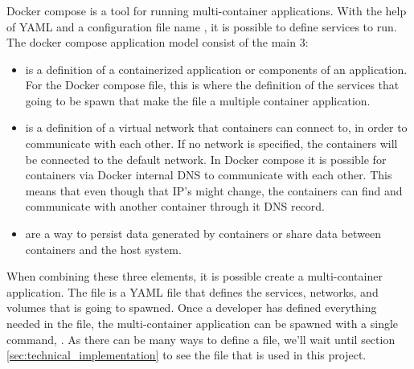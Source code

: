 \subsubsection{}
Docker compose is a tool for running multi-container applications. With the help of \ac{YAML}\cite{YAML}
and a configuration file name , it is possible to define services to run.
The docker compose\cite{docker-compose} application model consist of the main 3:
\begin{itemize}
    \item {} is a definition of a containerized application or components of an application. For the Docker compose file,
    this is where the definition of the services that going to be spawn that make the  file a multiple container application.
    \item {} is a definition of a virtual network that containers can connect to, in order to communicate with each other.
    If no network is specified, the containers will be connected to the default network. In Docker compose it is possible for 
    containers via Docker internal \ac{DNS} to communicate with each other. 
    This means that even though that IP's might change, the containers can find and communicate with another container through it \ac{DNS} record.
    \item {} are a way to persist data generated by containers or share data between containers and the host system. 
\end{itemize}
When combining these three elements, it is possible create a multi-container application. The  file is a 
\ac{YAML} file that defines the services, networks, and volumes that is going to spawned. Once a developer
has defined everything needed in the  file, the multi-container application 
can be spawned with a single command, . As there can be many ways to define a  file, 
we'll wait until section \ref{sec:technical_implementation} to see the  file that is used in this project.
\newpage